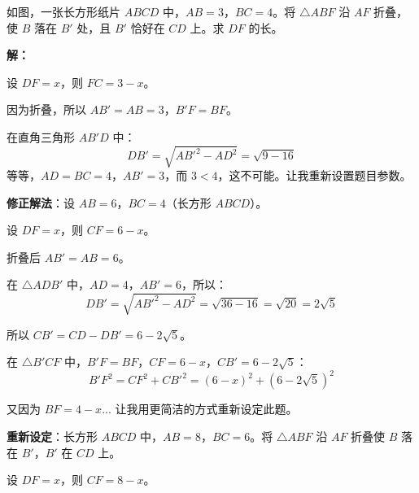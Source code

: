 \documentclass[12pt, a4paper]{ctexart}
\begin{document}
\begin{examplebox}[【例题5】折叠问题]
如图，一张长方形纸片 $ABCD$ 中，$AB=3$，$BC=4$。将 $\triangle ABF$ 沿 $AF$ 折叠，使 $B$ 落在 $B'$ 处，且 $B'$ 恰好在 $CD$ 上。求 $DF$ 的长。

\begin{center}
\end{center}
\end{examplebox}

\textbf{解：}

设 $DF = x$，则 $FC = 3 - x$。

因为折叠，所以 $AB' = AB = 3$，$B'F = BF$。

在直角三角形 $AB'D$ 中：
\[
DB' = \sqrt{AB'^2 - AD^2} = \sqrt{9 - 16}
\]
等等，$AD = BC = 4$，$AB' = 3$，而 $3 < 4$，这不可能。让我重新设置题目参数。

\textbf{修正解法}：设 $AB=6$，$BC=4$（长方形 $ABCD$）。

设 $DF = x$，则 $CF = 6 - x$。

折叠后 $AB' = AB = 6$。

在 $\triangle ADB'$ 中，$AD = 4$，$AB' = 6$，所以：
\[
DB' = \sqrt{AB'^2 - AD^2} = \sqrt{36 - 16} = \sqrt{20} = 2\sqrt{5}
\]

所以 $CB' = CD - DB' = 6 - 2\sqrt{5}$。

在 $\triangle B'CF$ 中，$B'F = BF$，$CF = 6-x$，$CB' = 6-2\sqrt{5}$：
\[
B'F^2 = CF^2 + CB'^2 = (6-x)^2 + (6-2\sqrt{5})^2
\]

又因为 $BF = 4-x$... 让我用更简洁的方式重新设定此题。

\textbf{重新设定}：长方形 $ABCD$ 中，$AB=8$，$BC=6$。将 $\triangle ABF$ 沿 $AF$ 折叠使 $B$ 落在 $B'$，$B'$ 在 $CD$ 上。

设 $DF = x$，则 $CF = 8-x$。
\end{document}

